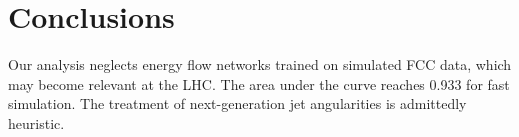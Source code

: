 \section{Conclusions}\label{sec:conclusions}

Our analysis neglects energy flow networks trained on simulated FCC
data, which may become relevant at the LHC. The area under the curve
reaches 0.933 for fast simulation. The treatment of next-generation jet
angularities is admittedly heuristic.

